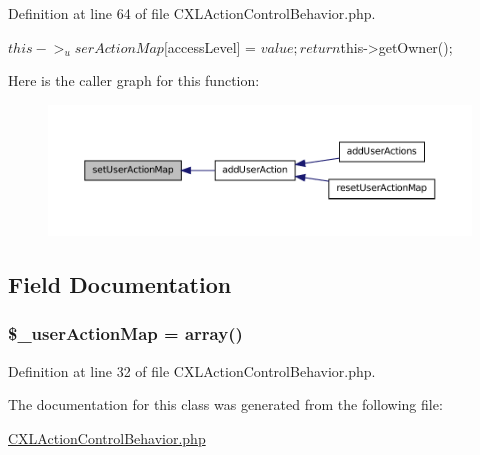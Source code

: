 Definition at line 64 of file CXLActionControlBehavior.php.




\begin{DoxyCode}
    {
        $this->_userActionMap[$accessLevel] = $value;
        return $this->getOwner();
    }
\end{DoxyCode}




Here is the caller graph for this function:\nopagebreak
\begin{figure}[H]
\begin{center}
\leavevmode
\includegraphics[width=400pt]{classCXLUserActionBehavior_ab596b5f38307ae814ca5d0757babf136_icgraph}
\end{center}
\end{figure}




\subsection{Field Documentation}
\hypertarget{classCXLUserActionBehavior_a7632198654cfa044b1d5f296f634078e}{
\subsubsection[{\$\_\-userActionMap}]{\setlength{\rightskip}{0pt plus 5cm}\$\_\-userActionMap = array()}}
\label{classCXLUserActionBehavior_a7632198654cfa044b1d5f296f634078e}


Definition at line 32 of file CXLActionControlBehavior.php.



The documentation for this class was generated from the following file:\begin{DoxyCompactItemize}
\item 
\hyperlink{CXLActionControlBehavior_8php}{CXLActionControlBehavior.php}\end{DoxyCompactItemize}
